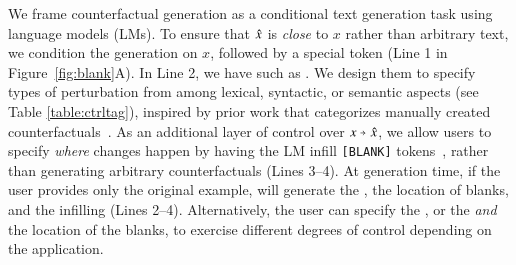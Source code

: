 We frame counterfactual generation as a conditional text generation task using language models (LMs). To ensure that $\hat{x}$ is \emph{close} to $x$ rather than arbitrary text, we condition the generation on $x$, followed by a special token (Line 1 in Figure~\ref{fig:blank}A).
In Line 2, we have \emph{\tagstrs} \cite{ctrl} such as .
We design them to specify types of perturbation from among lexical, syntactic, or semantic aspects (see Table \ref{table:ctrltag}), inspired by prior work that categorizes manually created counterfactuals~\cite{kaushik2019learning, gardner2020contrast}.
As an additional layer of control over $x \veryshortarrow \xp$, %
we allow users to specify \emph{where} changes happen by having the LM infill \texttt{[BLANK]} tokens~\cite{donahue2020enabling}, rather than generating arbitrary counterfactuals (Lines 3--4).
At generation time, if the user provides only the original example, \sysname will generate the \tagstr, the location of blanks, and the infilling (Lines 2--4). 
Alternatively, the user can specify the \tagstr, or the \tagstr \emph{and} the location of the blanks, to exercise different degrees of control depending on the application.




